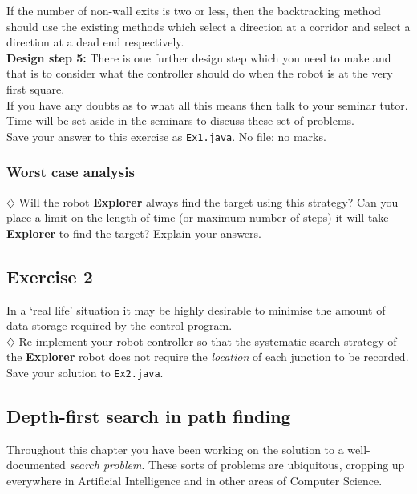 \noindent
If the number of non-wall exits is two or less, then the backtracking
method should use the existing methods which select a direction at a
corridor and select a direction at a dead end respectively. \\

\noindent
{\bf Design step 5:} There is one further design step which you need to make
and that is to consider what the controller should do when the robot is
at the very first square. \\

\noindent
If you have any doubts as to what all this means then talk to your
seminar tutor. Time will be set aside in the seminars to discuss these set of
problems. \\

\noindent Save your answer to this exercise as {\tt Ex1.java}. No
file; no marks.

\subsubsection{Worst case analysis}

$\diamondsuit$
Will the robot {\bf Explorer} always find the target using this strategy? Can you place
a limit on the length of time (or maximum number of steps) it will take {\bf Explorer} to find the target?
Explain your answers.


\subsection{Exercise 2}

In a `real life' situation it may be highly desirable to minimise the amount
of data storage required by the control program. \\

\noindent
$\diamondsuit$ Re-implement your robot controller so that the systematic search strategy of
the {\bf Explorer} robot does not require the \emph{location} of
each junction to be recorded. \\

\noindent
Save your solution to {\tt Ex2.java}.


\subsection{Depth-first search in path finding}

Throughout this chapter you have been working on the solution to a
well-documented {\it search problem}. These sorts of problems are ubiquitous,
cropping up everywhere in Artificial Intelligence and in other areas of
Computer Science.\\

